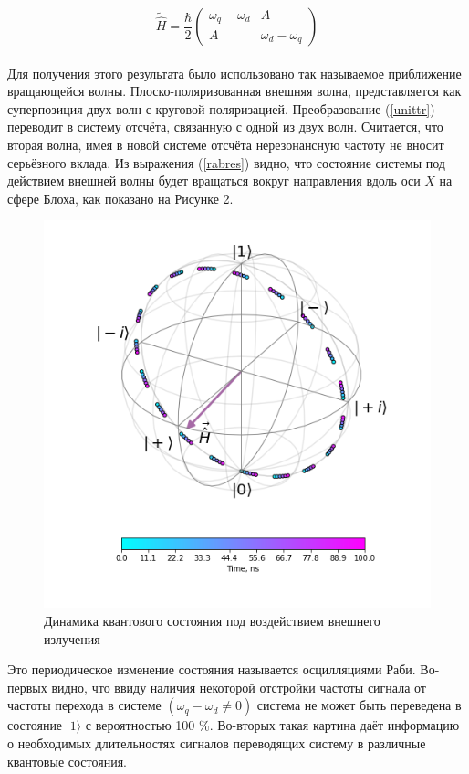 \begin{equation}
\tag{16}
\tilde{\hat{H}} = \frac{\hbar}{2}
\begin{pmatrix}
	\omega_q - \omega_d & A\\
	A&			\omega_d - \omega_q 
\end{pmatrix}
\end{equation}
\\
Для получения этого результата было использовано так называемое приближение вращающейся волны. Плоско-поляризованная внешняя волна, представляется как суперпозиция двух волн с круговой поляризацией. Преобразование (\ref{unittr}) переводит в систему отсчёта, связанную с одной из двух волн. Считается, что вторая волна, имея в новой системе отсчёта нерезонансную частоту не вносит серьёзного вклада. Из выражения (\ref{rabres}) видно, что состояние системы под действием внешней волны будет вращаться вокруг направления вдоль оси $X$ на сфере Блоха, как показано на Рисунке 2.
\begin{figure}[!h]
	\centering
	\includegraphics[width=0.4\linewidth]{pictures/Rabi}
	\caption{Динамика квантового состояния под воздействием внешнего излучения}
	\label{fig:rabi}
\end{figure}

Это периодическое изменение состояния называется осцилляциями Раби. Во-первых видно, что ввиду наличия некоторой отстройки частоты сигнала от частоты перехода в системе $(\omega_q - \omega_d \ne 0)$ система не может быть переведена в состояние $|1\rangle$ с вероятностью 100 \%. Во-вторых такая картина даёт информацию о необходимых длительностях сигналов переводящих систему в различные квантовые состояния. 

